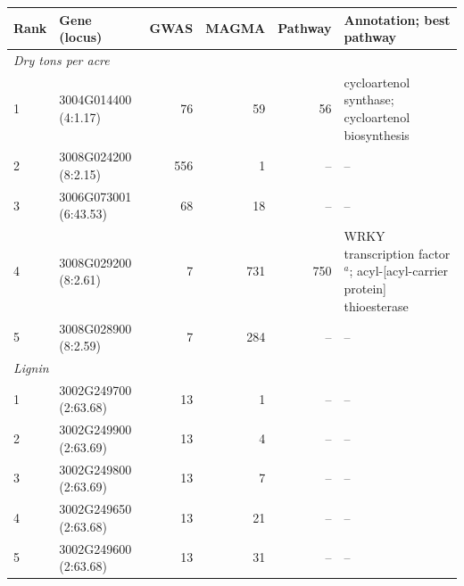 \begin{table}[!t]
\begin{tabular}{llrrrrl}
\textbf{Rank} & \textbf{Gene (locus)} & \textbf{GWAS} & \textbf{MAGMA} & \textbf{Pathway} & \multicolumn{2}{l}{\textbf{Annotation; best pathway}} \\
\hline
\multicolumn{7}{l}{\textit{Dry tons per acre}} \\
1 & 3004G014400 (4:1.17) & 76 & 59 & 56 & \multicolumn{2}{l}{cycloartenol synthase; cycloartenol biosynthesis} \\
2 & 3008G024200 (8:2.15) & 556 & 1 & -- & \multicolumn{2}{l}{--} \\
3 & 3006G073001 (6:43.53) & 68 & 18 & -- & \multicolumn{2}{l}{--} \\
4 & 3008G029200 (8:2.61) & 7 & 731 & 750 & \multicolumn{2}{l}{WRKY transcription factor$^{a}$; acyl-[acyl-carrier protein] thioesterase} \\
5 & 3008G028900 (8:2.59) & 7 & 284 & -- & \multicolumn{2}{l}{--} \\
\multicolumn{7}{l}{\textit{Lignin}} \\
1 & 3002G249700 (2:63.68) & 13 & 1 & -- & \multicolumn{2}{l}{--} \\
2 & 3002G249900 (2:63.69) & 13 & 4 & -- & \multicolumn{2}{l}{--} \\
3 & 3002G249800 (2:63.69) & 13 & 7 & -- & \multicolumn{2}{l}{--} \\
4 & 3002G249650 (2:63.68) & 13 & 21 & -- & \multicolumn{2}{l}{--} \\
5 & 3002G249600 (2:63.68) & 13 & 31 & -- & \multicolumn{2}{l}{--} \\
\hline
\end{tabular}
\end{table}
